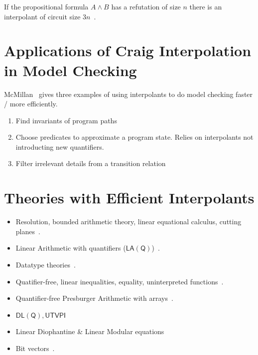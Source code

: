 \documentclass{article}
\begin{document}
If the propositional formula $A \wedge B$
 has a refutation of size $n$ there
 is an interpolant of circuit size $3n$~\cite{k-jsl-1997}.

\section{Applications of Craig Interpolation in Model Checking}
McMillan~\cite{m-tacas-2005} gives three examples of using interpolants to do
 model checking faster / more efficiently.
\begin{enumerate}
\item Find invariants of program paths
\item Choose predicates to approximate a program state.
      Relies on interpolants not introducting new quantifiers.%
\item Filter irrelevant details from a transition relation %
\end{enumerate}


\section{Theories with Efficient Interpolants}
\begin{itemize}
\item Resolution, bounded arithmetic theory, linear equational calculus, cutting planes~\cite{k-jsl-1997}.
\item Linear Arithmetic with quantifiers ($\mathsf{LA(Q)}$)~\cite{m-tcs-2005}.
\item Datatype theories~\cite{kmz-sigsoft-2006}.
\item Quatifier-free, linear inequalities, equality, uninterpreted functions~\cite{m-tcs-2005}.
\item Quantifier-free Presburger Arithmetic with arrays~\cite{bkrw-preprint-2010}.
\item $\mathsf{DL(Q)}, \mathsf{UTVPI}$
\item
  Linear Diophantine \& Linear Modular equations~\cite{jcg-cav-2008}
\item Bit vectors~\cite{g-fmcad-2011}.
\end{itemize}
\end{document}
